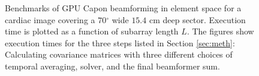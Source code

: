 \documentclass[journal]{IEEEtran}
\newcommand{\degree}{\ensuremath{^\circ}}
\begin{document}
\begin{figure}[!t]
\centerline{
\hfil
{}}
\caption{Benchmarks of GPU Capon beamforming in element space for a cardiac image covering a $70\degree$ wide $15.4$ cm deep sector. Execution time is plotted as a function of subarray length $L$. The figures show execution times for the three steps listed in Section \ref{sec:meth}: Calculating covariance matrices with three different choices of temporal averaging, solver, and the final beamformer sum.}
\label{fig:bench}
\end{figure}
\end{document}
